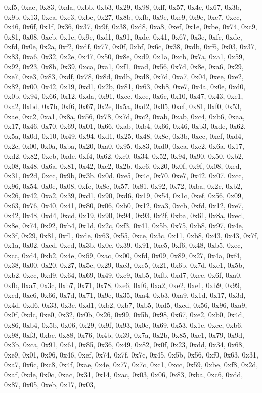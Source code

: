\documentclass[
]{book}
\begin{document}
0xf5, 0xae, 0x83, 0xda, 0xbb, 0xb3, 0x29, 0x98, 0xff, 0x57, 0x4c, 0x67, 0x3b, 0x9b, 0x13, 0xca, 0xe3, 0xbe, 0x27, 0x8b, 0xfb, 0x9e, 0xe9, 0x9e, 0xe7, 0xcc, 0x46, 0x6f, 0x1f, 0x36, 0x37, 0x9f, 0x38, 0xd8, 0xa8, 0xef, 0x1e, 0xbe, 0x74, 0xc9, 0x81, 0x08, 0xeb, 0x1e, 0x9e, 0xd1, 0x91, 0xde, 0x41, 0x67, 0x3e, 0xfc, 0xdc, 0xfd, 0x0e, 0x2a, 0xf2, 0xdf, 0x77, 0x0f, 0xbf, 0x6c, 0x38, 0xdb, 0xf6, 0x03, 0x37, 0x83, 0xa6, 0x32, 0x2e, 0x47, 0x50, 0x8e, 0xd9, 0x1a, 0xcb, 0x7a, 0xa1, 0x59, 0x92, 0x23, 0x8b, 0x39,
0xca, 0xa1, 0xf1, 0xad, 0x56, 0x7d, 0x8e, 0xa6, 0x29, 0xe7, 0xe3, 0x83, 0xdf, 0x78, 0x8d, 0xdb, 0xd8, 0x7d, 0xa7, 0x04, 0xee, 0xe2, 0x82, 0x00, 0x42, 0x19, 0xd1, 0x2b, 0x81, 0x63, 0xb8, 0xe7, 0x4a, 0x0e, 0xd0, 0x0b, 0x94, 0x66, 0x12, 0xda, 0x91, 0xcc, 0xee, 0x6c, 0x10, 0x47, 0x43, 0xe1, 0xa2, 0xbd, 0x7b, 0xf6, 0x67, 0x2e, 0x5a, 0xd2, 0x05, 0xcf, 0x81, 0xf0, 0x53, 0xae, 0xc2, 0xa1, 0x8a, 0x56, 0x78, 0x7d, 0xc2, 0xab, 0xab, 0xc4, 0xb6, 0xaa, 0x17, 0x46, 0x70, 0x69, 0x01, 0x66, 0xab, 0xb4, 0x66, 0x46,
0xb3, 0xde, 0x62, 0x5a, 0x0d, 0x10, 0x49, 0x94, 0xd1, 0x25, 0x48, 0x8e, 0x3b, 0xcc, 0xcf, 0xd4, 0x2c, 0x00, 0x0a, 0xba, 0x20, 0xa0, 0x95, 0x83, 0xd0, 0xca, 0xc2, 0x6a, 0x17, 0xd2, 0x82, 0xeb, 0xde, 0xf4, 0x62, 0xc0, 0x34, 0x52, 0x94, 0x90, 0x50, 0xb2, 0x08, 0x48, 0x6a, 0x81, 0x42, 0xc2, 0x2b, 0xe6, 0x20, 0x0f, 0x9f, 0x08, 0xed, 0x31, 0x2d, 0xcc, 0x9b, 0x3b, 0x0d, 0xe5, 0x4c, 0x70, 0xe7, 0x42, 0x07, 0xcc, 0x96, 0x54, 0x0e, 0x08, 0xfe, 0x8c, 0x57, 0x81, 0x92, 0x72, 0xba, 0x2c, 0xb2, 0x26, 0x42, 0xa2,
0x39, 0xd1, 0x90, 0xd6, 0x19, 0x54, 0x1c, 0xef, 0x56, 0x09, 0x63, 0x76, 0x40, 0x41, 0x80, 0x06, 0xb0, 0x12, 0xa3, 0xcb, 0xfd, 0x12, 0xe7, 0x42, 0x48, 0xd4, 0xcd, 0x19, 0x90, 0x94, 0x93, 0x2f, 0xba, 0x61, 0x8a, 0xed, 0x8e, 0x74, 0x92, 0xb4, 0x1d, 0x2c, 0xf3, 0x41, 0x5b, 0x75, 0xb8, 0x97, 0x4e, 0x3f, 0x29, 0x81, 0xf1, 0xde, 0x63, 0x55, 0xce, 0x3c, 0x11, 0xb8, 0x43, 0x43, 0x7f, 0x1a, 0x02, 0xed, 0xed, 0x3b, 0x0e, 0x39, 0x91, 0xe5, 0xf6, 0x48, 0xb5, 0xec, 0xcc, 0xd4, 0xb2, 0x4e, 0x69, 0xac, 0x00, 0xfd,
0x09, 0x89, 0x27, 0x4a, 0xf4, 0x38, 0x00, 0x20, 0x27, 0x5c, 0x29, 0xe3, 0xe5, 0x21, 0x6b, 0x7d, 0xe1, 0x5b, 0xb2, 0xcc, 0xd9, 0x64, 0x69, 0x49, 0xc9, 0xb5, 0xfb, 0xd7, 0xee, 0x6f, 0xa0, 0xfb, 0xa7, 0x3c, 0xb7, 0x71, 0x78, 0xe6, 0xf6, 0xa2, 0xe2, 0xe1, 0xb9, 0x99, 0xcd, 0xe6, 0x66, 0x7d, 0x71, 0x9e, 0x35, 0xa4, 0xb3, 0xa9, 0x1d, 0x17, 0x3d, 0x4d, 0xd6, 0x33, 0x3e, 0xd1, 0xb2, 0xb7, 0xb5, 0xd5, 0xcd, 0x56, 0x96, 0xa9, 0x0f, 0xdc, 0xe0, 0x32, 0x0b, 0x26, 0x99, 0x5b, 0x98, 0x67, 0xe2, 0xb0, 0x4d, 0x86,
0xb4, 0x5b, 0x06, 0x29, 0x9f, 0x93, 0x0e, 0x69, 0x53, 0x1c, 0xec, 0xb6, 0x98, 0xf3, 0xbe, 0x88, 0x76, 0x4b, 0x39, 0x7a, 0x2b, 0x85, 0xe1, 0x79, 0x9d, 0x3b, 0xca, 0x91, 0x61, 0x85, 0x36, 0x49, 0x82, 0x0f, 0x23, 0xdd, 0x34, 0x68, 0xe9, 0x01, 0x96, 0x46, 0xef, 0x74, 0x7f, 0x7c, 0x45, 0x5b, 0x56, 0xf0, 0x63, 0x31, 0xa7, 0x6c, 0xc8, 0x4f, 0xae, 0x4e, 0x77, 0x7c, 0xc1, 0xcc, 0x59, 0xbe, 0xf8, 0x2d, 0xaf, 0xde, 0x0c, 0xac, 0x31, 0x14, 0xac, 0x03, 0x06, 0x83, 0xba, 0xc6, 0xdd, 0x87, 0x05, 0xeb, 0x17, 0x03,
\end{document}

